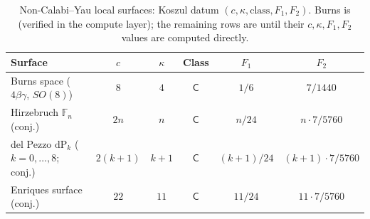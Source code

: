 \begin{table}[htbp]
\caption{Non-Calabi--Yau local surfaces: Koszul datum
$(c, \kappa, \mathrm{class}, F_1, F_2)$. Burns is
\ClaimStatusProvedElsewhere{} \textup{(}verified in the compute
layer\textup{)}; the remaining rows are \ClaimStatusConjectured{}
until their \(c,\kappa,F_1,F_2\) values are computed directly.}
\label{tab:non-cy-local-surfaces}
\begin{center}
\small
\renewcommand{\arraystretch}{1.20}
\begin{tabular}{lccccc}
\toprule
Surface & $c$ & $\kappa$ & Class & $F_1$ & $F_2$ \\
\midrule
Burns space \textup{(}$4\beta\gamma$, $SO(8)$\textup{)}
 & $8$ & $4$ & $\mathsf{C}$
 & $1/6$ & $7/1440$ \\[1pt]
Hirzebruch $\mathbb{F}_n$ \textup{(}conj.\textup{)}
 & $2n$ & $n$ & $\mathsf{C}$
 & $n/24$ & $n \cdot 7/5760$ \\[1pt]
del Pezzo $\mathrm{dP}_k$ \textup{(}$k=0,\ldots,8$; conj.\textup{)}
 & $2(k{+}1)$ & $k{+}1$ & $\mathsf{C}$
 & $(k{+}1)/24$ & $(k{+}1) \cdot 7/5760$ \\[1pt]
Enriques surface \textup{(}conj.\textup{)}
 & $22$ & $11$ & $\mathsf{C}$
 & $11/24$ & $11 \cdot 7/5760$ \\
\bottomrule
\end{tabular}
\end{center}
\end{table}

